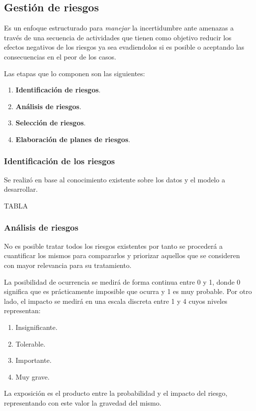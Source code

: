 \documentclass[a4paper,12pt]{article}
\begin{document}
\subsection{Gestión de riesgos}
Es un enfoque estructurado para \textit{manejar} la incertidumbre ante amenazas a través de una secuencia de actividades que tienen como objetivo reducir los efectos negativos de los riesgos ya sea evadiendolos si es posible o aceptando las consecuencias en el peor de los casos. 

Las etapas que lo componen son las siguientes:
\begin{enumerate}[noitemsep, topsep=2pt]
	\item \textbf{Identificación de riesgos}.
	\item \textbf{Análisis de riesgos}.
	\item \textbf{Selección de riesgos}.
	\item \textbf{Elaboración de planes de riesgos}.
\end{enumerate}

\subsubsection{Identificación de los riesgos}
Se realizó en base al conocimiento existente sobre los datos y el modelo a desarrollar.

TABLA

\subsubsection{Análisis de riesgos}
No es posible tratar todos los riesgos existentes por tanto se procederá a cuantificar los mismos para compararlos y priorizar aquellos que se consideren con mayor relevancia para su tratamiento. 

La posibilidad de ocurrencia se medirá de forma continua entre 0 y 1, donde 0 significa que es prácticamente imposible que ocurra y 1 es muy probable. Por otro lado, el impacto se medirá en una escala discreta entre 1 y 4 cuyos niveles representan:
\begin{enumerate}[noitemsep, topsep=2pt]
	\item Insignificante.
	\item Tolerable.
	\item Importante.
	\item Muy grave.
\end{enumerate}

La exposición es el producto entre la probabilidad y el impacto del riesgo, representando con este valor la gravedad del mismo.
\end{document}
